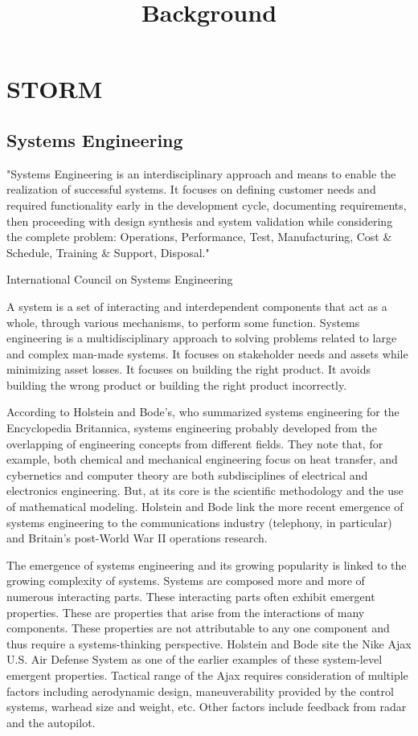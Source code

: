 \documentclass[../../main/main.tex]{subfiles}
\begin{document}
\title{Background}


\chapter{STORM}\label{chp:srorm}

\section{Systems Engineering}\label{sec:stormse}
"Systems Engineering is an interdisciplinary approach and means to enable the realization of successful systems. It focuses on defining customer needs and required functionality early in the development cycle, documenting requirements, then proceeding with design synthesis and system validation while considering the complete problem: Operations, Performance, Test, Manufacturing, Cost \& Schedule, Training \& Support, Disposal."

International Council on Systems Engineering 

A system is a set of interacting and interdependent components that act as a whole,  through various mechanisms, to perform some function. Systems engineering is a multidisciplinary approach to solving problems related to large and complex man-made systems.  It focuses on stakeholder needs and assets while minimizing asset losses.  It focuses on building the right product.  It avoids building the wrong product or building the right product incorrectly.  

According to Holstein and Bode's, who summarized systems engineering for the Encyclopedia Britannica, systems engineering probably developed from the overlapping of engineering concepts from different fields. They note that, for example, both chemical and mechanical engineering focus on heat transfer, and cybernetics and computer theory are both subdisciplines of electrical and electronics engineering.   But, at its core is the scientific methodology and the use of mathematical modeling.  Holstein and Bode link the more recent emergence of systems engineering to the communications industry (telephony, in particular) and Britain's post-World War II operations research.

The emergence of systems engineering and its growing popularity is linked to the growing complexity of systems.  Systems are composed more and more of numerous interacting parts.  These interacting parts often exhibit emergent properties.  These are properties that arise from the interactions of many components.  These properties are not attributable to any one component and thus require a systems-thinking perspective. Holstein and Bode site the Nike Ajax U.S. Air Defense System as one of the earlier examples of these system-level emergent properties. Tactical range of the Ajax requires consideration of multiple factors including aerodynamic design, maneuverability provided by the control systems, warhead size and weight, etc.  Other factors include feedback from radar and the autopilot.
\end{document}
